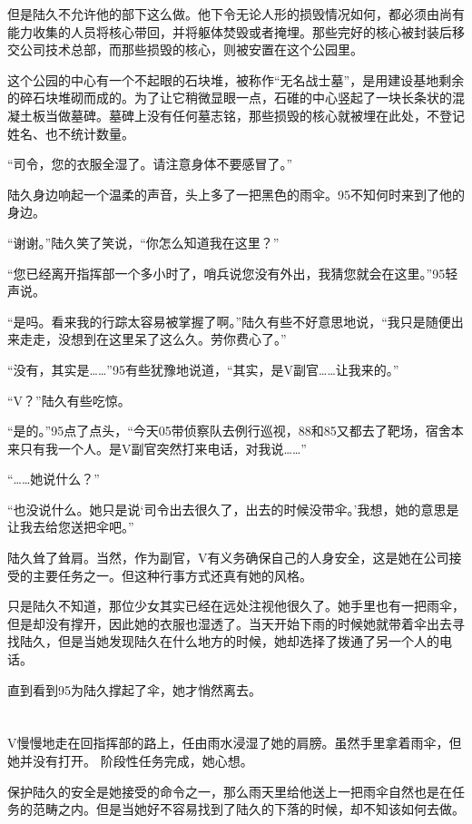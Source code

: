 但是陆久不允许他的部下这么做。他下令无论人形的损毁情况如何，都必须由尚有能力收集的人员将核心带回，并将躯体焚毁或者掩埋。那些完好的核心被封装后移交公司技术总部，而那些损毁的核心，则被安置在这个公园里。

这个公园的中心有一个不起眼的石块堆，被称作“无名战士墓”，是用建设基地剩余的碎石块堆砌而成的。为了让它稍微显眼一点，石碓的中心竖起了一块长条状的混凝土板当做墓碑。墓碑上没有任何墓志铭，那些损毁的核心就被埋在此处，不登记姓名、也不统计数量。

“司令，您的衣服全湿了。请注意身体不要感冒了。”

陆久身边响起一个温柔的声音，头上多了一把黑色的雨伞。95不知何时来到了他的身边。

“谢谢。”陆久笑了笑说，“你怎么知道我在这里？”

“您已经离开指挥部一个多小时了，哨兵说您没有外出，我猜您就会在这里。”95轻声说。

“是吗。看来我的行踪太容易被掌握了啊。”陆久有些不好意思地说，“我只是随便出来走走，没想到在这里呆了这么久。劳你费心了。”

“没有，其实是……”95有些犹豫地说道，“其实，是V副官……让我来的。”

“V？”陆久有些吃惊。

“是的。”95点了点头，“今天05带侦察队去例行巡视，88和85又都去了靶场，宿舍本来只有我一个人。是V副官突然打来电话，对我说……”

“……她说什么？”

“也没说什么。她只是说‘司令出去很久了，出去的时候没带伞。’我想，她的意思是让我去给您送把伞吧。”

陆久耸了耸肩。当然，作为副官，V有义务确保自己的人身安全，这是她在公司接受的主要任务之一。但这种行事方式还真有她的风格。

只是陆久不知道，那位少女其实已经在远处注视他很久了。她手里也有一把雨伞，但是却没有撑开，因此她的衣服也湿透了。当天开始下雨的时候她就带着伞出去寻找陆久，但是当她发现陆久在什么地方的时候，她却选择了拨通了另一个人的电话。

直到看到95为陆久撑起了伞，她才悄然离去。
\section*{}

V慢慢地走在回指挥部的路上，任由雨水浸湿了她的肩膀。虽然手里拿着雨伞，但她并没有打开。
阶段性任务完成，她心想。

保护陆久的安全是她接受的命令之一，那么雨天里给他送上一把雨伞自然也是在任务的范畴之内。但是当她好不容易找到了陆久的下落的时候，却不知该如何去做。

